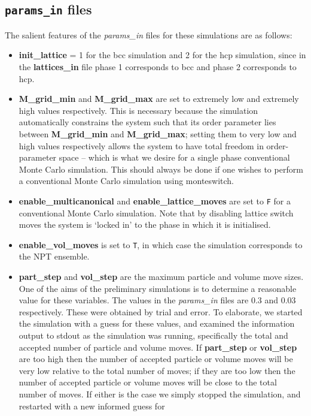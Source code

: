 \documentclass{report}
\begin{document}
\subsection{\texttt{params\_in} files}
The salient features of the \emph{params\_in} files for these simulations are as follows:
\begin{itemize}
\item \textbf{init\_lattice} = 1 for the bcc simulation and 2 for the hcp simulation, since in the \textbf{lattices\_in} file phase 1 corresponds to
  bcc and phase 2 corresponds to hcp.
\item \textbf{M\_grid\_min} and \textbf{M\_grid\_max} are set to extremely low and extremely high values respectively. This is necessary because
  the simulation automatically constrains the system such that its order parameter lies between \textbf{M\_grid\_min} and \textbf{M\_grid\_max};
  setting them to very low and high values respectively allows the system to have total freedom in order-parameter space --
  which is what we desire for a single phase conventional Monte Carlo simulation. This should always be done if one wishes
  to perform a conventional Monte Carlo simulation using monteswitch.
\item \textbf{enable\_multicanonical} and \textbf{enable\_lattice\_moves} are set to \texttt{F} for a conventional Monte Carlo simulation. Note that by
  disabling lattice switch moves the system is `locked in' to the phase in which it is initialised.
\item \textbf{enable\_vol\_moves} is set to \texttt{T}, in which case the simulation corresponds to the NPT ensemble. 
\item \textbf{part\_step} and \textbf{vol\_step} are the maximum particle and volume move sizes. One of the aims of the preliminary simulations is
  to determine a reasonable value for these variables. The values in the \emph{params\_in} files are 0.3 and 0.03 respectively. These
  were obtained by trial and error. To elaborate, we started the simulation with a guess for these values, and examined the 
  information output to stdout as the simulation was running, specifically the total and accepted number of particle and 
  volume moves. If \textbf{part\_step} or \textbf{vol\_step} are too high then the number of accepted particle or volume moves will be very low 
  relative to the total number of moves; if they are too low then the number of accepted particle or volume moves will be close
  to the total number of moves. If either is the case we simply stopped the simulation, and restarted with a new informed guess for

\end{itemize}
\end{document}
